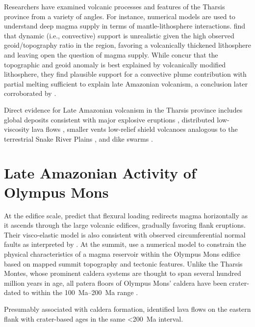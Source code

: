 Researchers have examined volcanic processes and features of the Tharsis province from a variety of angles. For instance, numerical models are used to understand deep magma supply in terms of mantle-lithosphere interactions. \textcite{roberts_plume-induced_2004} find that dynamic (i.e., convective) support is unrealistic given the high observed geoid/topography ratio in the region, favoring a volcanically thickened lithosphere and leaving open the question of magma supply. While \textcite{redmond_numerical_2004} concur that the topographic and geoid anomaly is best explained by volcanically modified lithosphere, they find plausible support for a convective plume contribution with partial melting sufficient to explain late Amazonian volcanism, a conclusion later corroborated by \textcite{plesa_thermal_2018}.

Direct evidence for Late Amazonian volcanism in the Tharsis province includes global deposits consistent with major explosive eruptions \parencite{hynek_explosive_2003}, distributed low-viscosity lava flows \parencite{hauber_very_2011}, smaller vents \parencite{wilson_fissure_2009,richardson_small_2021} low-relief shield volcanoes analogous to the terrestrial Snake River Plains \parencite{hauber_topography_2009}, and dike swarms \parencite{pieterek_late_2022}.

\section{Late Amazonian Activity of Olympus Mons}

At the edifice scale, \textcite{mcgovern_state_1993} predict that flexural loading redirects magma horizontally as it ascends through the large volcanic edifices, gradually favoring flank eruptions. Their visco-elastic model is also consistent with observed circumferential normal faults as interpreted by \textcite{thomas_flank_1990}. At the summit, \textcite{zuber_caldera_1992} use a numerical model to constrain the physical characteristics of a magma reservoir within the Olympus Mons edifice based on mapped summit topography and tectonic features. Unlike the Tharsis Montes, whose prominent caldera systems are thought to span several hundred million years in age, all patera floors of Olympus Mons' caldera have been crater-dated to within the \qtyrange{100}{200}{Ma} range \parencite{neukum_recent_2004}.

Presumably associated with caldera formation, \textcite{basilevsky_geologically_2006} identified lava flows on the eastern flank with crater-based ages in the same \qty{<200}{Ma} interval.

